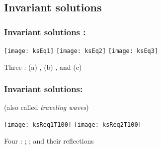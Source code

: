 \subsection{Invariant solutions}

\begin{frame}[shrink]%
  \frametitle{Invariant solutions : \eqva}
  \putsym


  \begin{center}
    \texttt{[image: ksEq1]}
    \texttt{[image: ksEq2]}
    \texttt{[image: ksEq3]}

    {
      Three \eqva: (a) , (b) , and (c) 
    }
  \end{center}

\end{frame}

\begin{frame}[shrink]%
  \frametitle{Invariant solutions: \reqva}
  \putsym

  (also called \emph{traveling waves})

    \begin{center}
    \texttt{[image: ksReq1T100]}
    \texttt{[image: ksReq2T100]}

    {
      Four \reqva: ; ; and their reflections
    }
    \end{center}

\end{frame}

